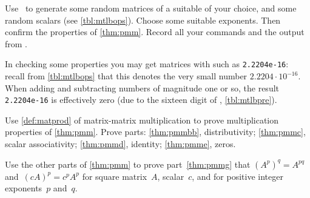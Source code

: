 \begin{exercise}  
Use \script\ to generate some random matrices of a suitable  of your choice, and some random scalars (see \autoref{tbl:mtlbops}).
Choose some suitable exponents.
Then confirm the  properties of \autoref{thm:pmm}.
Record all your commands and the output from \script.

In checking some properties you may get matrices with  such as \verb|2.2204e-16|: recall from \autoref{tbl:mtlbops} that this denotes the very small number \(2.2204\cdot10^{-16}\). 
When adding and subtracting numbers of magnitude one or so, the result \verb|2.2204e-16| is effectively zero (due to the sixteen digit  of \script, \autoref{tbl:mtlbpre}).
\end{exercise}

\begin{exercise}  
Use \autoref{def:matprod} of matrix-matrix multiplication to prove multiplication properties of \autoref{thm:pmm}. 
Prove parts: \ref{thm:pmmbb}, distributivity; \ref{thm:pmmc}, scalar associativity; \ref{thm:pmmd}, identity; \ref{thm:pmme}, zeros.
\end{exercise}

\begin{exercise}  
Use the other parts of \autoref{thm:pmm} to prove part~\ref{thm:pmmg} that \((A^p)^q=A^{pq}\) and~\((cA)^p=c^pA^p\) for square matrix~\(A\), scalar~\(c\), and for positive integer exponents~\(p\) and~\(q\).
\end{exercise}


